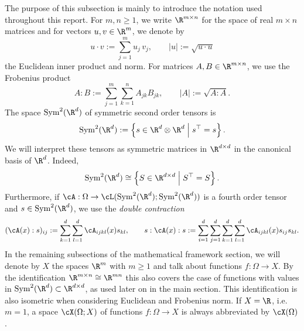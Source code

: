 The purpose of this subsection is mainly to introduce the notation used throughout this report. For $m,n\ge 1$, we write $\R^{m\times n}$ for the space of real $m\times n$ matrices and for vectors $u,v\in\R^m$, we denote by
\begin{equation*}
	u\cdot v := \sum_{j=1}^m u_j\,v_j,
	\qquad
	|u| := \sqrt{u\cdot u}
\end{equation*}
the Euclidean inner product and norm. For matrices $A,B\in\R^{m\times n}$, we use the Frobenius product
\begin{equation*}
	A:B := \sum_{j=1}^m\sum_{k=1}^n A_{jk}B_{jk},
	\qquad
	|A| := \sqrt{A:A}.
\end{equation*}
The space $\mathrm{Sym}^2(\R^d)$ of symmetric second order tensors is
\begin{equation*}
	\mathrm{Sym}^2(\R^d):= \left\{ s\in\R^d\otimes\R^d\;\middle|\; s^\top = s\right\}.
\end{equation*}
We will interpret these tensors as symmetric matrices in $\R^{d\times d}$ in the canonical basis of $\R^d$. Indeed,
\begin{equation*}
	\mathrm{Sym}^2(\R^d)\cong \left\{S\in\R^{d\times d}\;\middle|\; S^\top = S\right\}.
\end{equation*}
Furthermore, if $\cA:\Omega\to\cL(\mathrm{Sym}^2(\R^d);\mathrm{Sym}^2(\R^d))$ is a fourth order tensor and $s\in\mathrm{Sym}^2(\R^d)$, we use the {\em double contraction}
\begin{equation*}
	(\cA(x):s)_{ij}:=\sum_{k = 1}^d \sum_{l = 1}^d \cA_{ijkl}(x)s_{kl},
	\qquad
	s:\cA(x):s:=\sum_{i = 1}^d \sum_{j = 1}^d \sum_{k = 1}^d \sum_{l = 1}^d\cA_{ijkl}(x)s_{ij}s_{kl}.
\end{equation*}
In the remaining subsections of the mathematical framework section, we will denote by $X$ the spaces $\R^m$ with $m\ge 1$ and talk about functions $f:\Omega\to X$. By the identification $\R^{m\times n}\cong\R^{mn}$ this also covers the case of functions with values in $\mathrm{Sym}^2(\R^d)\subset\R^{d\times d}$, as used later on in the main section. This identification is also isometric when considering Euclidean and Frobenius norm. If $X = \R$, i.e.\ $m=1$, a space $\cX(\Omega;X)$ of functions $f:\Omega\to X$ is always abbreviated by $\cX(\Omega)$.

